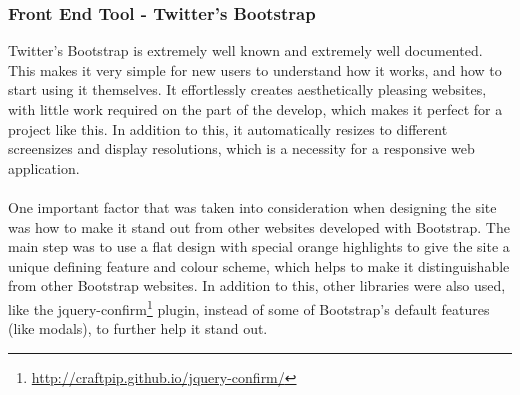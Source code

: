 \subsubsection{Front End Tool - Twitter's Bootstrap}
Twitter's Bootstrap is extremely well known and extremely well documented. This makes it very simple for new users to understand how it works, and how to start using it themselves. It effortlessly creates aesthetically pleasing websites, with little work required on the part of the develop, which makes it perfect for a project like this. In addition to this, it automatically resizes to different screensizes and display resolutions, which is a necessity for a responsive web application.\ \\
\ \\
One important factor that was taken into consideration when designing the site was how to make it stand out from other websites developed with Bootstrap. The main step was to use a flat design with special orange highlights to give the site a unique defining feature and colour scheme, which helps to make it distinguishable from other Bootstrap websites. In addition to this, other libraries were also used, like the jquery-confirm\footnote{\url{http://craftpip.github.io/jquery-confirm/}} plugin, instead of some of Bootstrap's default features (like modals), to further help it stand out.

\newpage 
